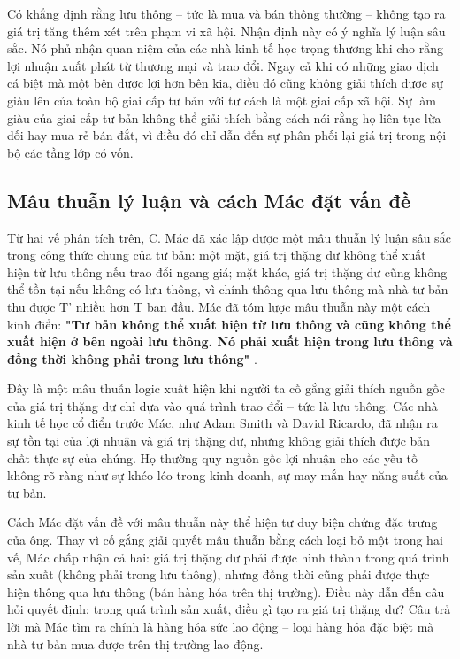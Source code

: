 Có khẳng định rằng lưu thông – tức là mua và bán thông thường – không tạo ra giá trị tăng thêm xét trên phạm vi xã hội. Nhận định này có ý nghĩa lý luận sâu sắc. Nó phủ nhận quan niệm của các nhà kinh tế học trọng thương khi cho rằng lợi nhuận xuất phát từ thương mại và trao đổi. Ngay cả khi có những giao dịch cá biệt mà một bên được lợi hơn bên kia, điều đó cũng không giải thích được sự giàu lên của toàn bộ giai cấp tư bản với tư cách là một giai cấp xã hội. Sự làm giàu của giai cấp tư bản không thể giải thích bằng cách nói rằng họ liên tục lừa dối hay mua rẻ bán đắt, vì điều đó chỉ dẫn đến sự phân phối lại giá trị trong nội bộ các tầng lớp có vốn.
\subsection{Mâu thuẫn lý luận và cách Mác đặt vấn đề}
Từ hai vế phân tích trên, C. Mác đã xác lập được một mâu thuẫn lý luận sâu sắc trong công thức chung của tư bản: một mặt, giá trị thặng dư không thể xuất hiện từ lưu thông nếu trao đổi ngang giá; mặt khác, giá trị thặng dư cũng không thể tồn tại nếu không có lưu thông, vì chính thông qua lưu thông mà nhà tư bản thu được T' nhiều hơn T ban đầu. Mác đã tóm lược mâu thuẫn này một cách kinh điển: \textbf{"Tư bản không thể xuất hiện từ lưu thông và cũng không thể xuất hiện ở bên ngoài lưu thông. Nó phải xuất hiện trong lưu thông và đồng thời không phải trong lưu thông"} \cite[trang 275]{marx_engels_23}.

Đây là một mâu thuẫn logic xuất hiện khi người ta cố gắng giải thích nguồn gốc của giá trị thặng dư chỉ dựa vào quá trình trao đổi – tức là lưu thông. Các nhà kinh tế học cổ điển trước Mác, như Adam Smith và David Ricardo, đã nhận ra sự tồn tại của lợi nhuận và giá trị thặng dư, nhưng không giải thích được bản chất thực sự của chúng. Họ thường quy nguồn gốc lợi nhuận cho các yếu tố không rõ ràng như sự khéo léo trong kinh doanh, sự may mắn hay năng suất của tư bản.

Cách Mác đặt vấn đề với mâu thuẫn này thể hiện tư duy biện chứng đặc trưng của ông. Thay vì cố gắng giải quyết mâu thuẫn bằng cách loại bỏ một trong hai vế, Mác chấp nhận cả hai: giá trị thặng dư phải được hình thành trong quá trình sản xuất (không phải trong lưu thông), nhưng đồng thời cũng phải được thực hiện thông qua lưu thông (bán hàng hóa trên thị trường). Điều này dẫn đến câu hỏi quyết định: trong quá trình sản xuất, điều gì tạo ra giá trị thặng dư? Câu trả lời mà Mác tìm ra chính là hàng hóa sức lao động – loại hàng hóa đặc biệt mà nhà tư bản mua được trên thị trường lao động.

